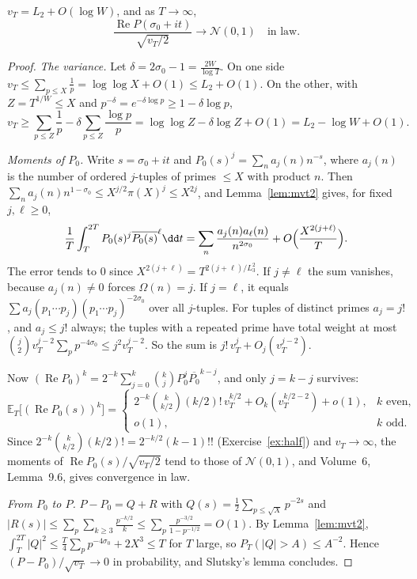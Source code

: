 \begin{proposition}\label{prop:primesgauss}
$v_T=L_2+O(\log W)$, and as $T\to\infty$,
\[
\frac{\operatorname{Re}P(\sigma_0+it)}{\sqrt{v_T/2}}\longrightarrow\mathcal N(0,1)\quad\text{in law}.
\]
\end{proposition}
\begin{proof}
\emph{The variance.} Let $\delta=2\sigma_0-1=\frac{2W}{\log T}$. On one side $v_T\le\sum_{p\le X}\frac1p=\log\log X+O(1)\le L_2+O(1)$. On the other, with $Z=T^{1/W}\le X$ and $p^{-\delta}=e^{-\delta\log p}\ge1-\delta\log p$,
\[
v_T\ge\sum_{p\le Z}\frac1p-\delta\sum_{p\le Z}\frac{\log p}p=\log\log Z-\delta\log Z+O(1)=L_2-\log W+O(1).
\]

\emph{Moments of $P_0$.} Write $s=\sigma_0+it$ and $P_0(s)^j=\sum_na_j(n)n^{-s}$, where $a_j(n)$ is the number of ordered $j$-tuples of primes $\le X$ with product $n$. Then $\sum_na_j(n)n^{1-\sigma_0}\le X^{j/2}\pi(X)^j\le X^{2j}$, and Lemma~\ref{lem:mvt2} gives, for fixed $j,\ell\ge0$,
\[
\frac1T\int_T^{2T}P_0(s)^j\overline{P_0(s)}^\ell\dd t=\sum_n\frac{a_j(n)a_\ell(n)}{n^{2\sigma_0}}+O\Bigl(\frac{X^{2(j+\ell)}}T\Bigr).
\]
The error tends to $0$ since $X^{2(j+\ell)}=T^{2(j+\ell)/L_3^2}$. If $j\ne\ell$ the sum vanishes, because $a_j(n)\ne0$ forces $\Omega(n)=j$. If $j=\ell$, it equals $\sum a_j(p_1\cdots p_j)(p_1\cdots p_j)^{-2\sigma_0}$ over all $j$-tuples. For tuples of distinct primes $a_j=j!$, and $a_j\le j!$ always; the tuples with a repeated prime have total weight at most $\binom j2v_T^{j-2}\sum_pp^{-4\sigma_0}\le j^2v_T^{j-2}$. So the sum is $j!\,v_T^j+O_j(v_T^{j-2})$.

Now $(\operatorname{Re}P_0)^k=2^{-k}\sum_{j=0}^k\binom kjP_0^j\overline{P_0}^{k-j}$, and only $j=k-j$ survives:
\[
\mathbb E_T\bigl[(\operatorname{Re}P_0(s))^k\bigr]=\begin{cases}2^{-k}\binom k{k/2}(k/2)!\,v_T^{k/2}+O_k(v_T^{k/2-2})+o(1),&k\text{ even},\\o(1),&k\text{ odd}.\end{cases}
\]
Since $2^{-k}\binom k{k/2}(k/2)!=2^{-k/2}(k-1)!!$ (Exercise~\ref{ex:half}) and $v_T\to\infty$, the moments of $\operatorname{Re}P_0(s)/\sqrt{v_T/2}$ tend to those of $\mathcal N(0,1)$, and Volume~6, Lemma~9.6, gives convergence in law.

\emph{From $P_0$ to $P$.} $P-P_0=Q+R$ with $Q(s)=\frac12\sum_{p\le\sqrt X}p^{-2s}$ and $|R(s)|\le\sum_p\sum_{k\ge3}\frac{p^{-k/2}}k\le\sum_p\frac{p^{-3/2}}{1-p^{-1/2}}=O(1)$. By Lemma~\ref{lem:mvt2}, $\int_T^{2T}|Q|^2\le\frac T4\sum_pp^{-4\sigma_0}+2X^3\le T$ for $T$ large, so $P_T(|Q|>A)\le A^{-2}$. Hence $(P-P_0)/\sqrt{v_T}\to0$ in probability, and Slutsky's lemma concludes.
\end{proof}

